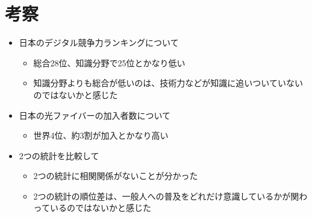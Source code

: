 \documentclass[a4paper,11pt,dvipdfmx]{ujarticle}
\begin{document}
\section{考察}
%
\begin{itemize}
    \item 日本のデジタル競争力ランキングについて
    \begin{itemize}
    \item 総合28位、知識分野で25位とかなり低い
    \item 知識分野よりも総合が低いのは、技術力などが知識に追いついていないのではないかと感じた
    \end{itemize}
    \item 日本の光ファイバーの加入者数について
    \begin{itemize}
    \item 世界4位、約3割が加入とかなり高い
    \end{itemize}
    \item 2つの統計を比較して
    \begin{itemize}
    \item 2つの統計に相関関係がないことが分かった
    \item 2つの統計の順位差は、一般人への普及をどれだけ意識しているかが関わっているのではないかと感じた
    \end{itemize}
\end{itemize}
%


\end{document}
